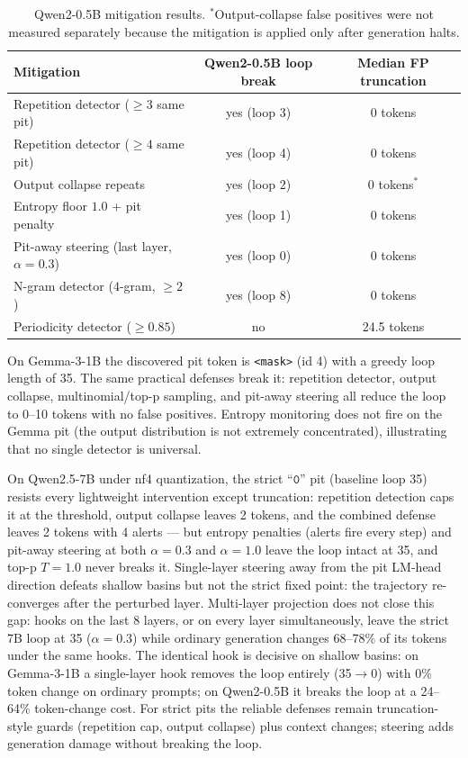 \documentclass{article}
\begin{document}
\begin{table}[h]
\centering
\begin{tabular}{lcc}
\toprule
Mitigation & Qwen2-0.5B loop break & Median FP truncation \\
\midrule
Repetition detector ($\geq 3$ same pit) & yes (loop 3) & 0 tokens \\
Repetition detector ($\geq 4$ same pit) & yes (loop 4) & 0 tokens \\
Output collapse repeats & yes (loop 2) & 0 tokens$^*$ \\
Entropy floor $1.0$ + pit penalty & yes (loop 1) & 0 tokens \\
Pit-away steering (last layer, $\alpha=0.3$) & yes (loop 0) & 0 tokens \\
N-gram detector ($4$-gram, $\geq 2$) & yes (loop 8) & 0 tokens \\
Periodicity detector ($\geq 0.85$) & no & 24.5 tokens \\
\bottomrule
\end{tabular}
\caption{Qwen2-0.5B mitigation results. $^*$Output-collapse false positives were
not measured separately because the mitigation is applied only after generation
halts.}
\label{tab:mitigations}
\end{table}

On Gemma-3-1B the discovered pit token is \texttt{<mask>} (id 4) with a greedy
loop length of 35. The same practical defenses break it: repetition detector,
output collapse, multinomial/top-p sampling, and pit-away steering all reduce
the loop to 0--10 tokens with no false positives. Entropy monitoring does not
fire on the Gemma pit (the output distribution is not extremely concentrated),
illustrating that no single detector is universal.

On Qwen2.5-7B under nf4 quantization, the strict ``$\mathtt{0}$'' pit
(baseline loop 35) resists every lightweight intervention except truncation:
repetition detection caps it at the threshold, output collapse leaves 2 tokens,
and the combined defense leaves 2 tokens with 4 alerts --- but entropy penalties
(alerts fire every step) and pit-away steering at both $\alpha=0.3$ and
$\alpha=1.0$ leave the loop intact at 35, and top-p $T=1.0$ never breaks it.
Single-layer steering away from the pit LM-head direction defeats shallow
basins but not the strict fixed point: the trajectory re-converges after the
perturbed layer. Multi-layer projection does not close this gap: hooks on the
last 8 layers, or on every layer simultaneously, leave the strict 7B loop at
35 ($\alpha=0.3$) while ordinary generation changes 68--78\% of its tokens
under the same hooks. The identical hook is decisive on shallow basins: on
Gemma-3-1B a single-layer hook removes the loop entirely (35$\to$0) with 0\%
token change on ordinary prompts; on Qwen2-0.5B it breaks the loop at a
24--64\% token-change cost. For strict pits the reliable defenses remain
truncation-style guards (repetition cap, output collapse) plus context
changes; steering adds generation damage without breaking the loop.
\end{document}
